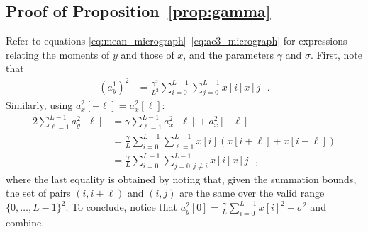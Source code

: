 \documentclass[12pt]{article}
\newcommand{\1}{\mathbf{1}}
\newcommand{\M}{m}
\renewcommand{\L}{\mathcal{L}}
\theoremstyle{plain}
\theoremstyle{definition}
\theoremstyle{remark}
\theoremstyle{plain}
\theoremstyle{remark}
\theoremstyle{plain}
\theoremstyle{plain}
\theoremstyle{plain}
\numberwithin{equation}{section}
\begin{document}
%
%

\subsection{Proof of Proposition~\ref{prop:gamma}} \label{sec:proof_prop_gamma}
Refer to equations \eqref{eq:mean_micrograph}--\eqref{eq:ac3_micrograph} for expressions relating the moments of $y$ and those of $x$, and the parameters $\gamma$ and $\sigma$. First,  note that 
\begin{align*}
	(a^1_y)^2 & = \frac{\gamma^2}{L^2}\sum_{i=0}^{L-1}\sum_{j=0}^{L-1}x[i]x[j].
\end{align*}
Similarly, using $a_x^2[-\ell] = a_x^2[\ell]$:
\begin{align*}
	2\sum_{\ell = 1}^{L-1}a_y^2[\ell] & = \gamma \sum_{\ell = 1}^{L-1} a_x^2[\ell] + a_x^2[-\ell] \\
									  & = \frac{\gamma}{L}\sum_{i=0}^{L-1}\sum_{\ell = 1}^{L-1} x[i]\left(x[i+\ell] + x[i-\ell]\right) \\ &= \frac{\gamma}{L} \sum_{i = 0}^{L-1} \sum_{j = 0, j \neq i}^{L-1} x[i] x[j],
\end{align*}
where the last equality is obtained by noting that, given the summation bounds, the set of pairs $(i, i\pm\ell)$ and $(i, j)$ are the same over the valid range $\{0, \ldots, L-1\}^2$. To conclude, notice that $a_y^2[0]=\frac{\gamma}{L}\sum_{i=0}^{L-1}x[i]^2 + \sigma^2$ and combine.
\end{document}

